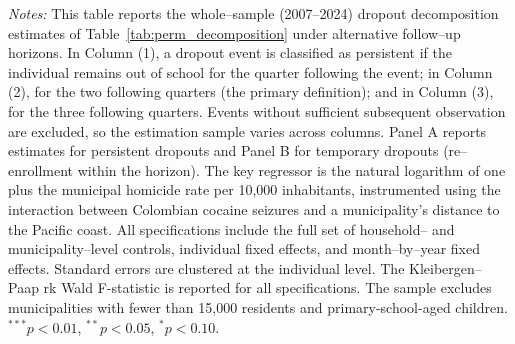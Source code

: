\documentclass[12pt,letter,english,intoc,bibliography=totoc,index=totoc,BCOR10mm,captions=tableheading,nottitlepage,fleqn]{article}
\theoremstyle{break}
\begin{document}
\begin{table}[H]
\centering
\caption{Dropout Decomposition: Alternative Follow--Up Horizons}
\label{tab:perm_horizons}
\centering
\scriptsize

\begin{minipage}{0.95\linewidth}
    \scriptsize \singlespacing
    \textit{Notes:} This table reports the whole--sample (2007--2024) dropout decomposition estimates of Table~\ref{tab:perm_decomposition} under alternative follow--up horizons. In Column (1), a dropout event is classified as persistent if the individual remains out of school for the quarter following the event; in Column (2), for the two following quarters (the primary definition); and in Column (3), for the three following quarters. Events without sufficient subsequent observation are excluded, so the estimation sample varies across columns. Panel A reports estimates for persistent dropouts and Panel B for temporary dropouts (re--enrollment within the horizon). The key regressor is the natural logarithm of one plus the municipal homicide rate per 10{,}000 inhabitants, instrumented using the interaction between Colombian cocaine seizures and a municipality's distance to the Pacific coast. All specifications include the full set of household-- and municipality--level controls, individual fixed effects, and month--by--year fixed effects. Standard errors are clustered at the individual level. The Kleibergen--Paap rk Wald F-statistic is reported for all specifications. The sample excludes municipalities with fewer than 15{,}000 residents and primary-school-aged children. $^{***}p<0.01$, $^{**}p<0.05$, $^{*}p<0.10$.
    \end{minipage}
\end{table}
\end{document}
